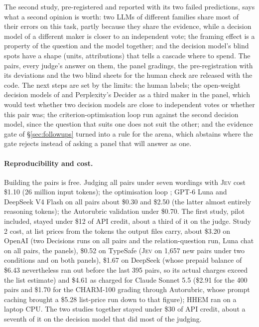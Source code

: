 \documentclass[11pt,a4paper]{article}
\newcommand{\jev}{\textsc{Jev}}
\begin{document}
The second study, pre-registered and reported with its two failed predictions, says what a second opinion is worth: two LLMs of different families share most of their errors on this task, partly because they share the evidence, while a decision model of a different maker is closer to an independent vote; the framing effect is a property of the question and the model together; and the decision model's blind spots have a shape (units, attributions) that tells a cascade where to spend. The pairs, every judge's answer on them, the panel gradings, the pre-registration with its deviations and the two blind sheets for the human check are released with the code. The next steps are set by the limits: the human labels; the open-weight decision models of \citet{duan2026jeval} and Perplexity's Decider as a third maker in the panel, which would test whether two decision models are close to independent votes or whether this pair was; the criterion-optimisation loop run against the second decision model, since the question that suits one does not suit the other; and the evidence gate of \S\ref{sec:followups} turned into a rule for the arena, which abstains where the gate rejects instead of asking a panel that will answer as one.

\paragraph{Reproducibility and cost.} Building the pairs is free. Judging all \nPairs{} pairs under seven wordings with \jev{} cost \$1.10 (26 million input tokens); the optimisation loop \optJevCost{}; GPT-6 Luna and DeepSeek V4 Flash on all pairs about \$0.30 and \$2.50 (the latter almost entirely reasoning tokens); the Autorubric validation under \$0.70. The first study, pilot included, stayed under \$12 of API credit, about a third of it on the judge. Study 2 cost, at list prices from the tokens the output files carry, about \$3.20 on OpenAI (two Decisions runs on all pairs and the relation-question run, Luna chat on all pairs, the panels), \$0.52 on TypeSafe (\jev{} on 1,657 new pairs under two conditions and on both panels), \$1.67 on DeepSeek (whose prepaid balance of \$6.43 nevertheless ran out before the last 395 pairs, so its actual charges exceed the list estimate) and \$4.61 as charged for Claude Sonnet 5.5 (\$2.91 for the 400 pairs and \$1.70 for the CHARM-100 grading through Autorubric, whose prompt caching brought a \$5.28 list-price run down to that figure); HHEM ran on a laptop CPU. The two studies together stayed under \$30 of API credit, about a seventh of it on the decision model that did most of the judging.
\end{document}
